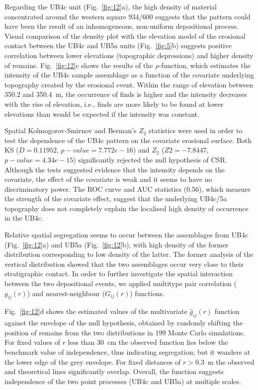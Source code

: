 \documentclass[preprint,authoryear,times]{elsarticle} %
\begin{document}
Regarding the UB4c unit (Fig.~\ref{fig:12}a), the high density of material concentrated around the western square 934/600 suggests that the pattern could have been the result of an inhomogeneous, non-uniform depositional process. Visual comparison of the density plot with the elevation model of the erosional contact between the UB4c and UB5a units (Fig.~\ref{fig:5}b) suggests positive correlation between lower elevations (topographic depressions) and higher density of remains. Fig.~\ref{fig:12}c shows the results of the $\rho$-function, which estimates the intensity of the UB4c sample assemblage as a function of the covariate underlying topography created by the erosional event. Within the range of elevation between 350.2 and 350.4~m, the occurrence of finds is higher and the intensity decreases with the rise of elevation, i.e., finds are more likely to be found at lower elevations than would be expected if the intensity was constant.

Spatial Kolmogorov-Smirnov and Berman's $Z_2$ \citep{Berman1986} statistics were used in order to test the dependence of the UB4c pattern on the covariate erosional surface. Both KS ($D=0.11952$, $p-value=7.772e-16$) and $Z_2$ ($Z2=-7.8447$, $p-value=4.34e-15$) significantly rejected the null hypothesis of CSR. Although the tests suggested evidence that the intensity depends on the covariate, the effect of the covariate is weak and it seems to have no discriminatory power. The ROC curve and AUC statistics (0.56), which measure the strength of the covariate effect, suggest that the underlying UB4c/5a topography does not completely explain the localised high density of occurrence in the UB4c.

Relative spatial segregation seems to occur between the assemblages from UB4c (Fig.~\ref{fig:12}a) and UB5a (Fig.~\ref{fig:12}b), with high density of the former distribution corresponding to low density of the latter. The former analysis of the vertical distribution showed that the two assemblages occur very close to their stratigraphic contact. In order to further investigate the spatial interaction between the two depositional events, we applied multitype pair correlation ($g_{ij}(r)$) and nearest-neighbour ($G_{ij}(r)$) functions.

Fig.~\ref{fig:12}d shows the estimated values of the multivariate $\hat{g}_{ij}(r)$ function against the envelope of the null hypothesis, obtained by randomly shifting the position of remains from the two distributions in 199 Monte Carlo simulations. For fixed values of $r$ less than 30~cm the observed function lies below the benchmark value of independence, thus indicating segregation; but it wanders at the lower edge of the grey envelope. For fixed distances of $r>0.3$~m the observed and theoretical lines significantly overlap. Overall, the function suggests independence of the two point processes (UB4c and UB5a) at multiple scales.
\end{document}
